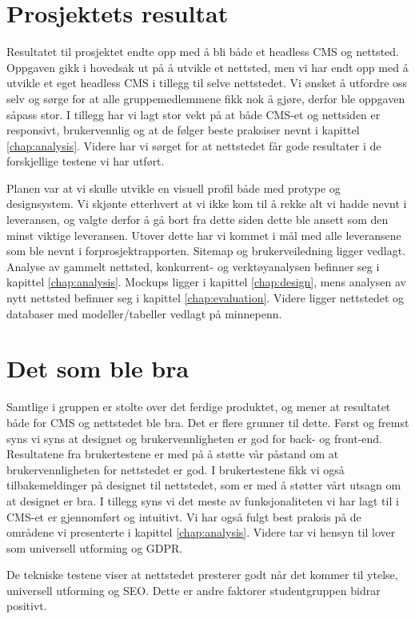 \section{Prosjektets resultat}
Resultatet til prosjektet endte opp med å bli både et headless CMS og nettsted. Oppgaven gikk i hovedsak ut på å utvikle et nettsted, men vi har endt opp med å utvikle et eget headless CMS i tillegg til selve nettstedet. Vi ønsket å utfordre oss selv og sørge for at alle gruppemedlemmene fikk nok å gjøre, derfor ble oppgaven såpass stor. I tillegg har vi lagt stor vekt på at både CMS-et og nettsiden er responsivt, brukervennlig og at de følger beste praksiser nevnt i kapittel \ref{chap:analysis}. Videre har vi sørget for at nettstedet får gode resultater i de forskjellige testene vi har utført.

Planen var at vi skulle utvikle en visuell profil både med protype og designsystem. Vi skjønte etterhvert at vi ikke kom til å rekke alt vi hadde nevnt i leveransen, og valgte derfor å gå bort fra dette siden dette ble ansett som den minst viktige leveransen. Utover dette har vi kommet i mål med alle leveransene som ble nevnt i forprosjektrapporten. Sitemap og brukerveiledning ligger vedlagt. Analyse av gammelt nettsted, konkurrent- og verktøyanalysen befinner seg i kapittel \ref{chap:analysis}. Mockups ligger i kapittel \ref{chap:design}, mens analysen av nytt nettsted befinner seg i kapittel \ref{chap:evaluation}. Videre ligger nettstedet og databaser med modeller/tabeller vedlagt på minnepenn.

\section{Det som ble bra}
Samtlige i gruppen er stolte over det ferdige produktet, og mener at resultatet både for CMS og nettstedet ble bra. Det er flere grunner til dette. Først og fremst syns vi syns at designet og brukervennligheten er god for back- og front-end. Resultatene fra brukertestene er med på å støtte vår påstand om at brukervennligheten for nettstedet er god. I brukertestene fikk vi også tilbakemeldinger på designet til nettstedet, som er med å støtter vårt utsagn om at designet er bra. I tillegg syns vi det meste av funksjonaliteten vi har lagt til i CMS-et er gjennomført og intuitivt. Vi har også fulgt best praksis på de områdene vi presenterte i kapittel \ref{chap:analysis}. Videre tar vi hensyn til lover som universell utforming og GDPR.

De tekniske testene viser at nettstedet presterer godt når det kommer til ytelse, universell utforming og SEO. Dette er andre faktorer studentgruppen bidrar positivt.

